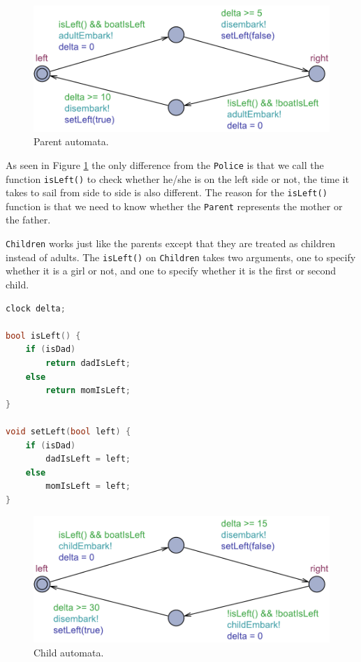 \documentclass[a4paper,12pt]{scrartcl}
\newcommand{\code}[1]{\colorbox{listinggray}{\texttt{#1}}}
\begin{document}
\begin{figure}[h!]
\centering
\includegraphics[width=0.7\linewidth]{Parent.pdf}
\caption{Parent automata.}
\label{fig:parent}
\end{figure}

As seen in Figure \ref{fig:parent} the only difference from the \code{Police} is that we call the function \code{isLeft()} to check whether he/she is on the left side or not, the time it takes to sail from side to side is also different. The reason for the \code{isLeft()} function is that we need to know whether the \code{Parent} represents the mother or the father.

\code{Children} works just like the parents except that they are treated as children instead of adults. The \code{isLeft()} on \code{Children} takes two arguments, one to specify whether it is a girl or not, and one to specify whether it is the first or second child.

\begin{lstlisting}[language=CPP, label = lst:plugin_example, caption = Parent declaration.]
clock delta;

bool isLeft() {
    if (isDad)
        return dadIsLeft;
    else
        return momIsLeft;
}

void setLeft(bool left) {
    if (isDad)
        dadIsLeft = left;
    else
        momIsLeft = left;
}
\end{lstlisting}

\begin{figure}[h!]
\centering
\includegraphics[width=0.7\linewidth]{Child.pdf}
\caption{Child automata.}
\label{fig:child}
\end{figure}
\end{document}
